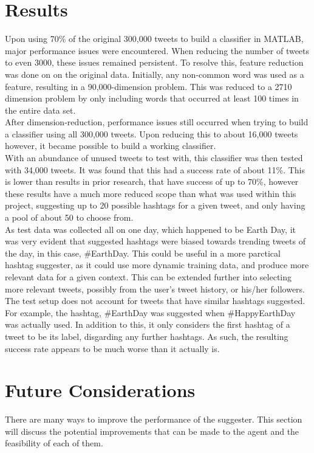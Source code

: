 \documentclass[conference]{IEEEtran}
\begin{document}
\section{Results}
Upon using 70\% of the original 300,000 tweets to build a classifier in MATLAB, major performance issues were encountered. When reducing the number of tweets to even 3000, these issues remained persistent. To resolve this, feature reduction was done on on the original data. Initially, any non-common word was used as a feature, resulting in a 90,000-dimension problem. This was reduced to a 2710 dimension problem by only including words that occurred at least 100 times in the entire data set. \\

After dimension-reduction, performance issues still occurred when trying to build a classifier using all 300,000 tweets. Upon reducing this to about 16,000 tweets however, it became possible to build a working classifier. \\

With an abundance of unused tweets to test with, this classifier was then tested with 34,000 tweets. It was found that this had a success rate of about 11\%. This is lower than results in prior research, that have success of up to 70\%, however these results have a much more reduced scope than what was used within this project, suggesting up to 20 possible hashtags for a given tweet, and only having a pool of about 50 to choose from. \\

As test data was collected all on one day, which happened to be Earth Day, it was very evident that suggested hashtags were biased towards trending tweets of the day, in this case, \#EarthDay. This could be useful in a more parctical hashtag suggester, as it could use more dynamic training data, and produce more relevant data for a given context. This can be extended further into selecting more relevant tweets, possibly from the user's tweet history, or his/her followers. \\

The test setup does not account for tweets that have similar hashtags suggested. For example, the hashtag, \#EarthDay was suggested when \#HappyEarthDay was actually used. In addition to this, it only considers the first hashtag of a tweet to be its label, disgarding any further hashtags. As such, the resulting success rate appears to be much worse than it actually is.

\section{Future Considerations} \label{sec:future}
There are many ways to improve the performance of the suggester. This section will discuss the potential improvements that can be made to the agent and the feasibility of each of them.
\end{document}
